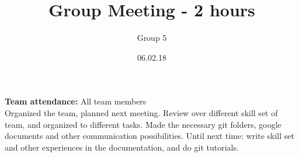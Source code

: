 \documentclass{article}
\title{Group Meeting - 2 hours}
\author{Group 5}
\date{06.02.18}
\begin{document}
	\maketitle
	\noindent
	\textbf{Team attendance:} All team members \\
	
	\noindent
	Organized the team, planned next meeting. Review over different skill set of team, 
	and organized to different tasks. Made the necessary git folders, google documents
 	and other communication possibilities. Until next time: write skill set and other 
 	experiences in the documentation, and do git tutorials.
\end{document}
